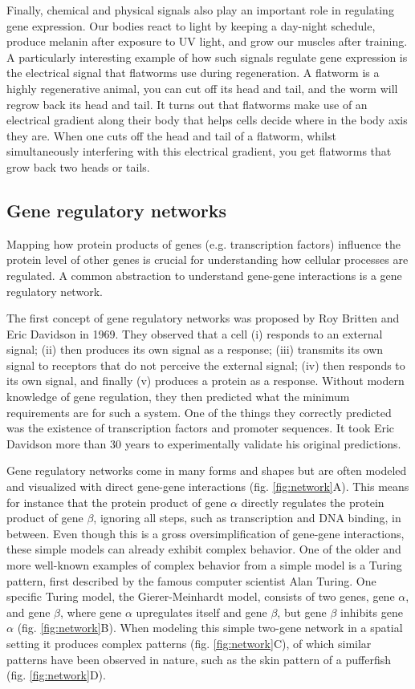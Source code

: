 Finally, chemical and physical signals also play an important role in regulating gene expression. Our bodies react to light by keeping a day-night schedule, produce melanin after exposure to UV light, and grow our muscles after training. A particularly interesting example of how such signals regulate gene expression is the electrical signal that flatworms use during regeneration. A flatworm is a highly regenerative animal, you can cut off its head and tail, and the worm will regrow back its head and tail. It turns out that flatworms make use of an electrical gradient along their body that helps cells decide where in the body axis they are. When one cuts off the head and tail of a flatworm, whilst simultaneously interfering with this electrical gradient, you get flatworms that grow back two heads or tails\cite{Levin2014}.

\subsection{Gene regulatory networks}

Mapping how protein products of genes (e.g. transcription factors) influence the protein level of other genes is crucial for understanding how cellular processes are regulated. A common abstraction to understand gene-gene interactions is a gene regulatory network.

The first concept of gene regulatory networks was proposed by Roy Britten and Eric Davidson in 1969\cite{Britten_1969}. They observed that a cell (i) responds to an external signal; (ii) then produces its own signal as a response; (iii) transmits its own signal to receptors that do not perceive the external signal; (iv) then responds to its own signal, and finally (v) produces a protein as a response. Without modern knowledge of gene regulation, they then predicted what the minimum requirements are for such a system. One of the things they correctly predicted was the existence of transcription factors and promoter sequences. It took Eric Davidson more than 30 years to experimentally validate his original predictions\cite{Davidson_2002}.

Gene regulatory networks come in many forms and shapes but are often modeled and visualized with direct gene-gene interactions (fig. \ref{fig:network}A). This means for instance that the protein product of gene $\alpha$ directly regulates the protein product of gene $\beta$, ignoring all steps, such as transcription and DNA binding, in between. Even though this is a gross oversimplification of gene-gene interactions, these simple models can already exhibit complex behavior. One of the older and more well-known examples of complex behavior from a simple model is a Turing pattern, first described by the famous computer scientist Alan Turing\cite{Turing1952}. One specific Turing model, the Gierer-Meinhardt model, consists of two genes, gene $\alpha$, and gene $\beta$, where gene $\alpha$ upregulates itself and gene $\beta$, but gene $\beta$ inhibits gene $\alpha$ (fig. \ref{fig:network}B). When modeling this simple two-gene network in a spatial setting it produces complex patterns (fig. \ref{fig:network}C), of which similar patterns have been observed in nature, such as the skin pattern of a pufferfish (fig. \ref{fig:network}D).

